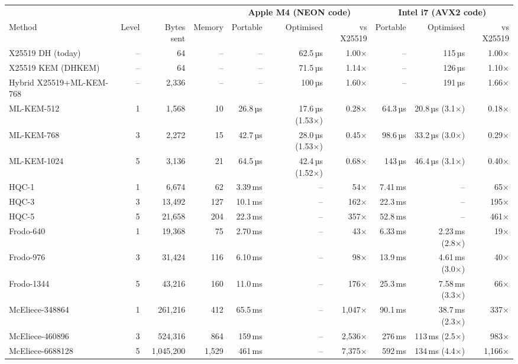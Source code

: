 \begin{tabular}{lrrrrrrrrr}
\toprule
 & & & & \multicolumn{3}{c}{\textbf{Apple M4 (NEON code)}} & \multicolumn{3}{c}{\textbf{Intel i7 (AVX2 code)}} \\ \cmidrule(lr){5-7}\cmidrule(lr){8-10}
Method & Level & Bytes sent & Memory & Portable & Optimised & vs X25519 & Portable & Optimised & vs X25519 \\
\midrule
X25519 DH (today) & – & 64 & – & – & 62.5\,µs & 1.00× & – & 115\,µs & 1.00× \\
X25519 KEM (DHKEM) & – & 64 & – & – & 71.5\,µs & 1.14× & – & 126\,µs & 1.10× \\
Hybrid X25519+ML-KEM-768 & – & 2,336 & – & – & 100\,µs & 1.60× & – & 191\,µs & 1.66× \\
\midrule
ML-KEM-512 & 1 & 1,568 & 10 & 26.8\,µs & 17.6\,µs {\scriptsize(1.53×)} & 0.28× & 64.3\,µs & 20.8\,µs {\scriptsize(3.1×)} & 0.18× \\
ML-KEM-768 & 3 & 2,272 & 15 & 42.7\,µs & 28.0\,µs {\scriptsize(1.53×)} & 0.45× & 98.6\,µs & 33.2\,µs {\scriptsize(3.0×)} & 0.29× \\
ML-KEM-1024 & 5 & 3,136 & 21 & 64.5\,µs & 42.4\,µs {\scriptsize(1.52×)} & 0.68× & 143\,µs & 46.4\,µs {\scriptsize(3.1×)} & 0.40× \\
\midrule
HQC-1 & 1 & 6,674 & 62 & 3.39\,ms & – & 54× & 7.41\,ms & – & 65× \\
HQC-3 & 3 & 13,492 & 127 & 10.1\,ms & – & 162× & 22.3\,ms & – & 195× \\
HQC-5 & 5 & 21,658 & 204 & 22.3\,ms & – & 357× & 52.8\,ms & – & 461× \\
\midrule
Frodo-640 & 1 & 19,368 & 75 & 2.70\,ms & – & 43× & 6.33\,ms & 2.23\,ms {\scriptsize(2.8×)} & 19× \\
Frodo-976 & 3 & 31,424 & 116 & 6.10\,ms & – & 98× & 13.9\,ms & 4.61\,ms {\scriptsize(3.0×)} & 40× \\
Frodo-1344 & 5 & 43,216 & 160 & 11.0\,ms & – & 176× & 25.3\,ms & 7.58\,ms {\scriptsize(3.3×)} & 66× \\
\midrule
McEliece-348864 & 1 & 261,216 & 412 & 65.5\,ms & – & 1,047× & 90.1\,ms & 38.7\,ms {\scriptsize(2.3×)} & 337× \\
McEliece-460896 & 3 & 524,316 & 864 & 159\,ms & – & 2,536× & 276\,ms & 113\,ms {\scriptsize(2.5×)} & 983× \\
McEliece-6688128 & 5 & 1,045,200 & 1,529 & 461\,ms & – & 7,375× & 592\,ms & 134\,ms {\scriptsize(4.4×)} & 1,166× \\
\bottomrule
\end{tabular}
